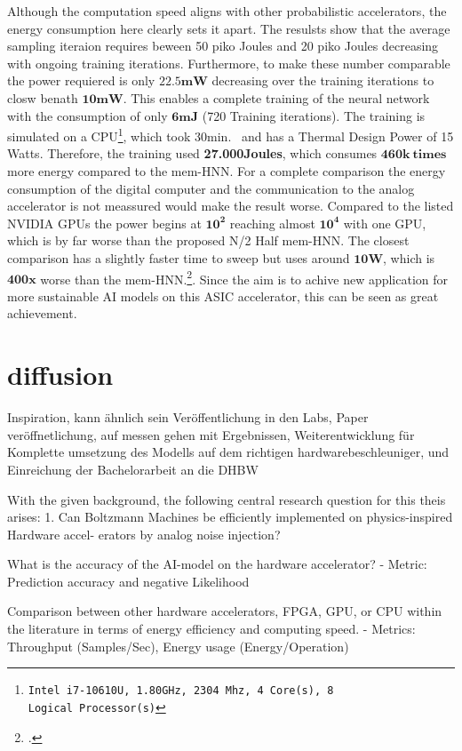 Although the computation speed aligns with other probabilistic accelerators, the energy consumption here clearly sets it apart.
The resulsts show that the average sampling iteraion requires beween 50 piko Joules and 20 piko Joules decreasing with ongoing training iterations.
Furthermore, to make these number comparable the power requiered is only \(\mathbf{22.5mW}\) decreasing over the training iterations to closw benath \(\mathbf{10mW}\).
This enables a complete training of the neural network with the consumption of only \(\mathbf{6 mJ}\) (720 Training iterations).
The training is simulated on a CPU\footnote{\texttt{Intel i7-10610U, 1.80GHz, 2304 Mhz, 4 Core(s), 8 Logical Processor(s)}}, which took 30min. \ and has a Thermal Design Power of 15 Watts.
Therefore, the training used \textbf{27.000Joules}, which consumes \(\mathbf{460k \ times}\) more energy compared to the \ac{mem-HNN}.
For a complete comparison the energy consumption of the digital computer and the communication to the analog accelerator is not meassured 
would make the result worse. 
Compared to the listed NVIDIA \ac{GPU}s the power begins at \(\mathbf{10^2}\) reaching almost \(\mathbf{10^4}\) with one \ac{GPU},
which is by far worse than the proposed N/2 Half \ac{mem-HNN}. The closest comparison has a slightly faster time to sweep
but uses around \(\mathbf{10W}\), which is \(\mathbf{400x}\) worse than the \ac{mem-HNN}.\footcite[cf.][2]{aaditAcceleratingAdaptiveParallel2023}.
Since the aim is to achive new application for more sustainable AI models on this \ac{ASIC} accelerator, 
this can be seen as great achievement.

\section{diffusion}
Inspiration, kann ähnlich sein
Veröffentlichung in den Labs, Paper veröffnetlichung, auf messen gehen mit Ergebnissen,
Weiterentwicklung für Komplette umsetzung des Modells auf dem richtigen hardwarebeschleuniger,
und Einreichung der Bachelorarbeit an die DHBW

With the given background, the following central research question for this theis arises:
1. Can Boltzmann Machines be efficiently implemented on physics-inspired Hardware accel-
erators by analog noise injection?

 What is the accuracy of the AI-model on the hardware accelerator?
- Metric: Prediction accuracy and negative Likelihood

 Comparison between other hardware accelerators, FPGA, GPU, or CPU within the
literature in terms of energy efficiency and computing speed.
- Metrics: Throughput (Samples/Sec), Energy usage (Energy/Operation)